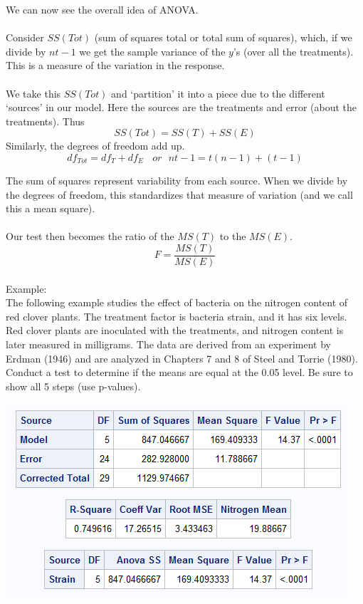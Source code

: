 \newpage

We can now see the overall idea of ANOVA. \\~\\
Consider $SS(Tot)$ (sum of squares total or total sum of squares), which, if we divide by $nt-1$ we get the sample variance of the $y$'s (over all the treatments).  This is a measure of the variation in the response.\\~\\
We take this $SS(Tot)$ and `partition' it into a piece due to the different `sources' in our model.  Here the sources are the treatments and error (about the treatments).  Thus
$$SS(Tot)=SS(T)+SS(E)$$
Similarly, the degrees of freedom add up.
$$df_{Tot}=df_{T}+df_{E}~~~~or~~~nt-1=t(n-1)+(t-1)$$

The sum of squares represent variability from each source.  When we divide by the degrees of freedom, this standardizes that measure of variation (and we call this a mean square).  \\~\\

Our test then becomes the ratio of the $MS(T)$ to the $MS(E)$.  
$$F=\frac{MS(T)}{MS(E)}$$
~\\

Example:\\
The following example studies the effect of bacteria on the nitrogen content of red clover plants. The treatment factor is bacteria strain, and it has six levels. Red clover plants are inoculated with the treatments, and nitrogen content is later measured in milligrams. The data are derived from an experiment by Erdman (1946) and are analyzed in Chapters 7 and 8 of Steel and Torrie (1980).  Conduct a test to determine if the means are equal at the 0.05 level.  Be sure to show all 5 steps (use p-values).
\begin{flushleft}
\includegraphics[scale=0.85]{cloveranova}
\end{flushleft}

